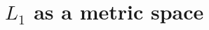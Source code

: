 \documentclass{icm2010}
\theoremstyle{definition}
\newcommand{\eqdef}{\stackrel{\mathrm{def}}{=}}
\newcommand{\1}{\mathbf{1}}
\newcommand{\M}{\mathscr{M}}
\renewcommand{\le}{\leqslant}
\renewcommand{\ge}{\geqslant}
\begin{document}

\section{$L_1$ as a metric space}\label{sec:L1}
\end{document}

